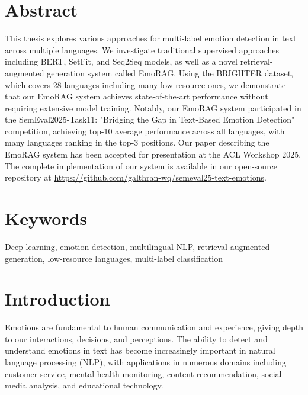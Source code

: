 \documentclass[a4paper,12pt]{extarticle}
\begin{document}
% 
\newpage
\setcounter{page}{2}


{
	\hypersetup{linkcolor=black}
	\tableofcontents
}

\newpage

\section*{Abstract}

This thesis explores various approaches for multi-label emotion detection in text across multiple languages. 
We investigate traditional supervised approaches including BERT, SetFit, and Seq2Seq models, as well as a novel retrieval-augmented generation system called EmoRAG. 
Using the BRIGHTER dataset, which covers 28 languages including many low-resource ones, we demonstrate that our EmoRAG system achieves state-of-the-art performance without requiring extensive model training. 
Notably, our EmoRAG system participated in the SemEval2025-Task11: "Bridging the Gap in Text-Based Emotion Detection" competition, achieving top-10 average performance across all languages, with many languages ranking in the top-3 positions. 
Our paper describing the EmoRAG system has been accepted for presentation at the ACL Workshop 2025. The complete implementation of our system is available in our open-source repository at \url{https://github.com/galthran-wq/semeval25-text-emotions}.


\section*{Keywords}
Deep learning, emotion detection, multilingual NLP, retrieval-augmented generation, low-resource languages, multi-label classification

\section{Introduction}

Emotions are fundamental to human communication and experience, giving depth to our interactions, decisions, and perceptions. The ability to detect and understand emotions in text has become increasingly important in natural language processing (NLP), with applications in numerous domains including customer service, mental health monitoring, content recommendation, social media analysis, and educational technology.
\end{document}
